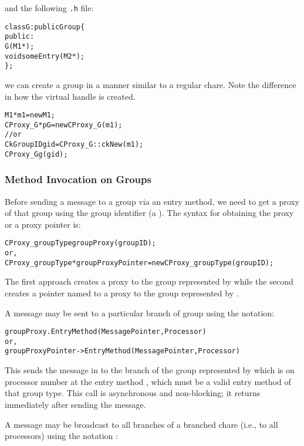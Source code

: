 and the following \texttt{.h} file:

\begin{alltt}
class G : public Group \{
  public:
    G(M1 *);
    void someEntry(M2 *);
\};
\end{alltt}

we can create a group in a manner similar to a regular
chare.  Note the difference in how the virtual handle is created.

\begin{alltt}
M1 *m1 = new M1;
CProxy_G *pG = new CProxy_G(m1);
  // or
CkGroupID gid = CProxy_G::ckNew(m1);
CProxy_G g(gid);
\end{alltt}

\subsubsection{Method Invocation on Groups}

Before sending a message to a group via an entry
method, we need to get a proxy of that group using the group identifier (a
). The syntax for obtaining the proxy or a proxy
pointer is:

\begin{alltt}
 CProxy_groupType groupProxy(groupID);
  or,
 CProxy_groupType *groupProxyPointer = new CProxy_groupType(groupID);
\end{alltt}

The first approach creates a proxy to the group represented by 
while the second creates a pointer named  to a proxy to
the group represented by . 

A message may be sent to a particular branch of group using the
notation:

\begin{alltt}
 groupProxy.EntryMethod(MessagePointer, Processor)
  or,
 groupProxyPointer->EntryMethod(MessagePointer, Processor)
\end{alltt}

This sends the message in  to the branch of
the group represented by  which is on processor number
 at the entry method , which must be a valid
entry method of that group type. This call is asynchronous and non-blocking; it
returns immediately after sending the message.

A message may be broadcast  to all branches of a branched
chare (i.e., to all processors) using the notation :

